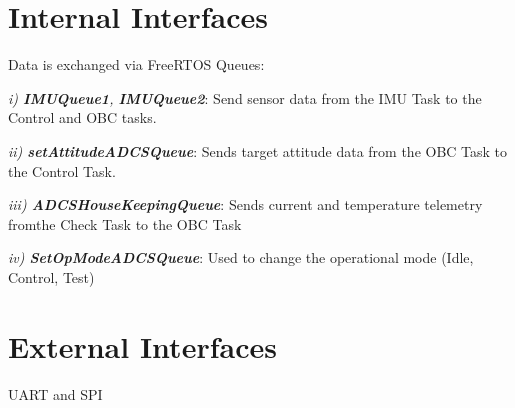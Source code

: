 \section{Internal Interfaces}
Data is exchanged via FreeRTOS Queues: 

\emph{i) \textbf{IMUQueue1}, \textbf{IMUQueue2}}: Send sensor data from the IMU Task to the Control and OBC tasks. 

\emph{ii) \textbf{setAttitudeADCSQueue}}: Sends target attitude data from the OBC Task to the Control Task. 

\emph{iii) \textbf{ADCSHouseKeepingQueue}}: Sends current and temperature telemetry fromthe Check Task to the OBC Task

\emph{iv) \textbf{SetOpModeADCSQueue}}: Used to change the operational mode (Idle, Control, Test)

\section{External Interfaces}
UART and SPI